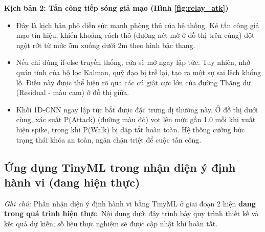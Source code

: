 \begin{itemize}
    \textbf{Kịch bản 2: Tấn công tiếp sóng giả mạo (Hình \ref{fig:relay_atk})}
    \begin{itemize}
        \item Đây là kịch bản phô diễn sức mạnh phòng thủ của hệ thống. Kẻ tấn công giả mạo tín hiệu, khiến khoảng cách thô (đường nét mờ ở đồ thị trên cùng) đột ngột rớt từ mức 5m xuống dưới 2m theo hình bậc thang.
        \item Nếu chỉ dùng if-else truyền thống, cửa sẽ mở ngay lập tức. Tuy nhiên, nhờ quán tính của bộ lọc Kalman, quỹ đạo bị trễ lại, tạo ra một sự sai lệch khổng lồ. Điều này được thể hiện rõ qua các cú giật cực lớn của đường Thặng dư (Residual - màu cam) ở đồ thị giữa.
        \item Khối 1D-CNN ngay lập tức bắt được đặc trưng dị thường này. Ở đồ thị dưới cùng, xác suất P(Attack) (đường màu đỏ) vọt lên mức gần 1.0 mỗi khi xuất hiện spike, trong khi P(Walk) bị dập tắt hoàn toàn. Hệ thống cưỡng bức trạng thái khóa an toàn, ngăn chặn triệt để cuộc tấn công.
    \end{itemize}
\end{itemize}
\fi

\subsection{Ứng dụng TinyML trong nhận diện ý định hành vi (đang hiện thực)}

\textit{Ghi chú:} Phần nhận diện ý định hành vi bằng TinyML ở giai đoạn 2 hiện \textbf{đang trong quá trình hiện thực}. Nội dung dưới đây trình bày quy trình thiết kế và kết quả dự kiến; số liệu thực nghiệm sẽ được cập nhật khi hoàn tất.

